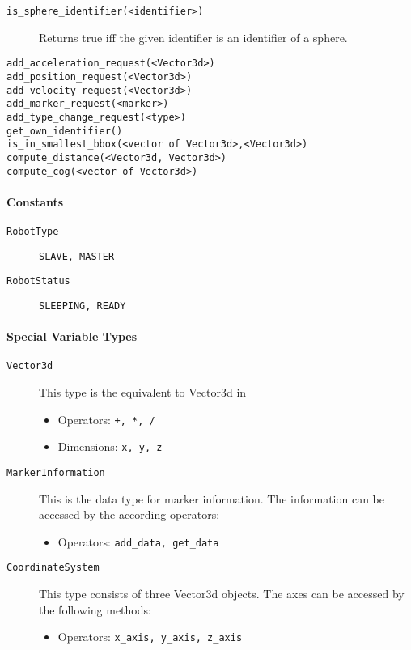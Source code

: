 \documentclass[a4paper,halfparskip,11pt,twoside]{scrartcl}
\begin{document}
\begin{description}
	\item [\texttt{is\_sphere\_identifier(<identifier>)}] Returns true iff the given identifier is an identifier of a sphere.
	\item [\texttt{add\_acceleration\_request(<Vector3d>)}] 
	\item [\texttt{add\_position\_request(<Vector3d>)}]
	\item [\texttt{add\_velocity\_request(<Vector3d>)}]
	\item [\texttt{add\_marker\_request(<marker>)}]
	\item [\texttt{add\_type\_change\_request(<type>)}]
	\item [\texttt{get\_own\_identifier()}]
	\item [\texttt{is\_in\_smallest\_bbox(<vector of Vector3d>,<Vector3d>)}]
	\item [\texttt{compute\_distance(<Vector3d, Vector3d>)}]
	\item [\texttt{compute\_cog(<vector of Vector3d>)}]
\end{description}

\paragraph{\Lua Constants}
\begin{description}
	\item [\texttt{RobotType}] \texttt{SLAVE, MASTER}
	\item [\texttt{RobotStatus}] \texttt{SLEEPING, READY}
\end{description}

\paragraph{Special Variable Types}
\begin{description}
	\item [\texttt{Vector3d}] This type is the \Lua equivalent to Vector3d in \RSS
	\begin{itemize}
		\item Operators: \texttt{+, *, /}
		\item Dimensions: \texttt{x, y, z}
	\end{itemize}
	\item [\texttt{MarkerInformation}] This is the data type for marker information. The information can be accessed by the according operators:
	\begin{itemize}
		\item Operators: \texttt{add\_data, get\_data}
	\end{itemize}
	\item [\texttt{CoordinateSystem}] This type consists of three Vector3d objects. The axes can be accessed by the following methods:
	\begin{itemize}
		\item Operators: \texttt{x\_axis, y\_axis, z\_axis}
	\end{itemize}

\end{description}
\end{document}
